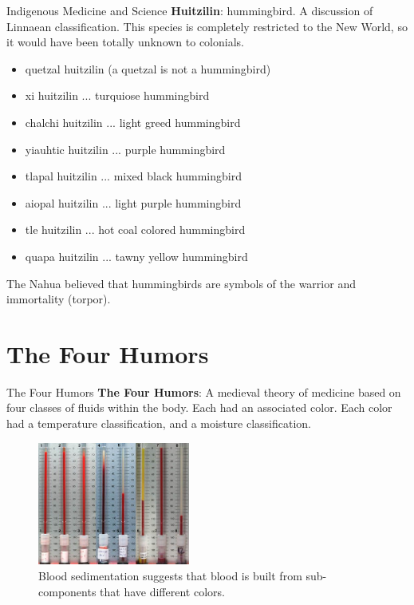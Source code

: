 \documentclass{beamer}
\begin{document}
\begin{frame}{Indigenous Medicine and Science}
\small
\textbf{Huitzilin}: hummingbird.  A discussion of Linnaean classification.  This species is completely restricted to the New World, so it would have been totally unknown to colonials.
\begin{itemize}
\item quetzal huitzilin (a quetzal is not a hummingbird)
\item xi huitzilin ... turquiose hummingbird
\item chalchi huitzilin ... light greed hummingbird
\item yiauhtic huitzilin ... purple hummingbird
\item tlapal huitzilin ... mixed black hummingbird
\item aiopal huitzilin ... light purple hummingbird
\item tle huitzilin ... hot coal colored hummingbird
\item quapa huitzilin ... tawny yellow hummingbird
\end{itemize}
The Nahua believed that hummingbirds are symbols of the warrior and immortality (torpor).
\end{frame}


\section{The Four Humors}

\begin{frame}{The Four Humors}
\textbf{\alert{The Four Humors}}: A medieval theory of medicine based on four classes of fluids within the body.  Each had an associated color.  Each color had a temperature classification, and a moisture classification.
\begin{figure}
\centering
\includegraphics[width=5cm]{figures/blood1.jpg}
\caption{\label{fig:blood1} Blood sedimentation suggests that blood is built from sub-components that have different colors.}
\end{figure}
\end{frame}
\end{document}
